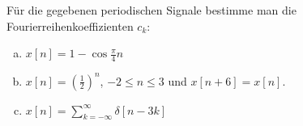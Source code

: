 \begin{uebsp}
\begin{Exercise}
Für die gegebenen periodischen Signale bestimme man die Fourierreihenkoeffizienten $c_k$:
\begin{enumerate}[a)]
    \item $x[n]=1-\cos\frac{\pi}{4}n$
    \item $x[n]=\left(\frac{1}{2}\right)^n$, $-2\leq n \leq 3$ und $x[n+6]=x[n]$.
    \item $x[n]=\sum_{k=-\infty}^\infty\delta[n-3k]$
\end{enumerate}
\end{Exercise}
\begin{Answer}
\end{Answer}
\end{uebsp}
